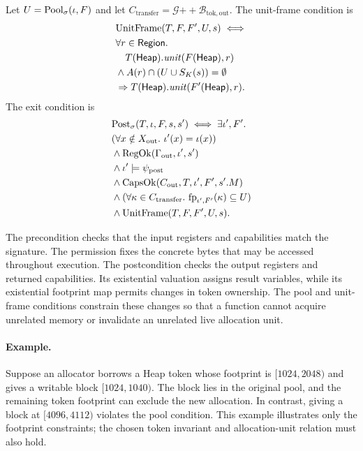 \begin{definition}
\[\]
Let $U=\mathrm{Pool}_\sigma(\iota,F)$ and let $C_{\mathrm{transfer}}=\mathcal G\mathbin{+\!+}\mathcal B_{\mathrm{tok,out}}$. The unit-frame condition is
\[
\begin{aligned}
&\mathrm{UnitFrame}(T,F,F',U,s)\iff\\ &\forall r\in\mathsf{Region}.\\ &\quad T(\mathsf{Heap}).\mathit{unit}(F(\mathsf{Heap}),r)\\
&\land A(r)\cap(U\cup S_K(s))=\emptyset\\
&\Rightarrow T(\mathsf{Heap}).\mathit{unit}(F'(\mathsf{Heap}),r).
\end{aligned}
\]
The exit condition is
\[
\begin{aligned}
&\Post_\sigma(T,\iota,F,s,s')\iff\exists\iota',F'.\\ &(\forall x\notin X_{\mathrm{out}}.\ \iota'(x)=\iota(x))\\
&\land\mathrm{RegOk}(\Gamma_{\mathrm{out}},\iota',s')\\ &\land\iota'\models\psi_{\mathrm{post}}\\
&\land\mathrm{CapsOk}(C_{\mathrm{out}},T,\iota',F',s'.M)\\
&\land(\forall\kappa\in C_{\mathrm{transfer}}.\ \fp_{\iota',F'}(\kappa)\subseteq U)\\
&\land\mathrm{UnitFrame}(T,F,F',U,s).
\end{aligned}
\]
\end{definition}

The precondition checks that the input registers and capabilities match the signature. The permission fixes the concrete bytes that may be accessed throughout execution. The postcondition checks the output registers and returned capabilities. Its existential valuation assigns result variables, while its existential footprint map permits changes in token ownership. The pool and unit-frame conditions constrain these changes so that a function cannot acquire unrelated memory or invalidate an unrelated live allocation unit.
\paragraph{Example.} Suppose an allocator borrows a Heap token whose footprint is $[1024,2048)$ and gives a writable block $[1024,1040)$. The block lies in the original pool, and the remaining token footprint can exclude the new allocation. In contrast, giving a block at $[4096,4112)$ violates the pool condition. This example illustrates only the footprint constraints; the chosen token invariant and allocation-unit relation must also hold.


